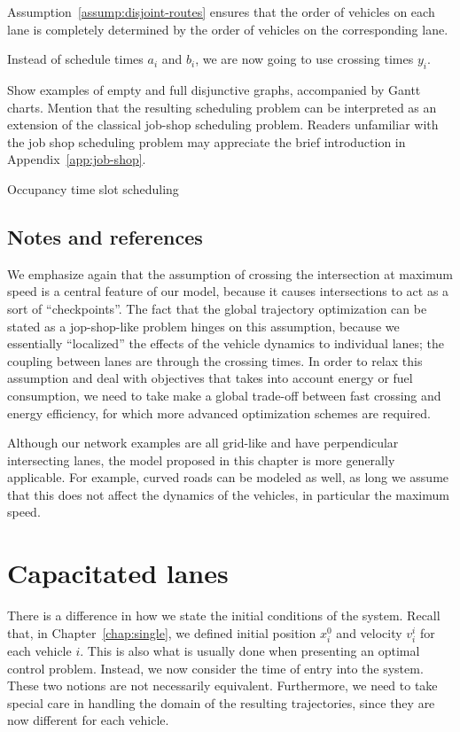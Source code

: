 \documentclass[a4paper]{report}
\theoremstyle{definition}
\theoremstyle{plain}
\newcommand\note[1]{{\color{Navy}#1}}
\begin{document}
Assumption~\ref{assump:disjoint-routes} ensures that the order of vehicles on
each lane is completely determined by the order of vehicles on the corresponding
lane.

Instead of schedule times $a_{i}$ and $b_{i}$, we are now going to use crossing
times $y_{i}$.

Show examples of empty and full disjunctive graphs, accompanied by Gantt charts.
%
Mention that the resulting scheduling problem can be interpreted as an extension
of the classical job-shop scheduling problem.
%
Readers unfamiliar with the job shop scheduling problem may appreciate the brief introduction in Appendix~\ref{app:job-shop}.

{\color{Navy} Occupancy time slot scheduling}


\section{Notes and references}

We emphasize again that the assumption of crossing the intersection at maximum
speed is a central feature of our model, because it causes intersections to act
as a sort of ``checkpoints''.
%
The fact that the global trajectory optimization can be stated as a
jop-shop-like problem hinges on this assumption, because we essentially
``localized'' the effects of the vehicle dynamics to individual lanes; the
coupling between lanes are through the crossing times.
%
In order to relax this assumption and deal with objectives that takes into
account energy or fuel consumption, we need to take make a global trade-off
between fast crossing and energy efficiency, for which more advanced
optimization schemes are required.

Although our network examples are all grid-like and have perpendicular
intersecting lanes, the model proposed in this chapter is more generally
applicable.
%
For example, curved roads can be modeled as well, as long we assume that this
does not affect the dynamics of the vehicles, in particular the maximum speed.

\chapter{Capacitated lanes}\label{chap:network}

\note{
There is a difference in how we state the initial conditions of the system.
%
Recall that, in Chapter~\ref{chap:single}, we defined initial position
$x_{i}^{0}$ and velocity $v_{i}^{i}$ for each vehicle $i$.
This is also what is usually done when presenting an optimal control problem.
%
Instead, we now consider the time of entry into the system.
%
These two notions are not necessarily equivalent.
%
Furthermore, we need to take special care in handling the domain of the
resulting trajectories, since they are now different for each vehicle.
}
\end{document}
